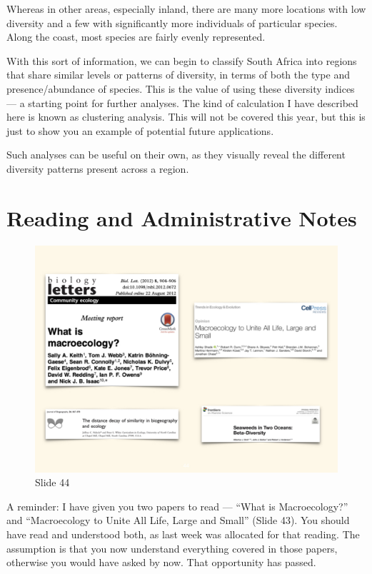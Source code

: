 \documentclass[
  11pt,
]{book}
\begin{document}
Whereas in other areas, especially inland, there are many more locations
with low diversity and a few with significantly more individuals of
particular species. Along the coast, most species are fairly evenly
represented.

With this sort of information, we can begin to classify South Africa
into regions that share similar levels or patterns of diversity, in
terms of both the type and presence/abundance of species. This is the
value of using these diversity indices --- a starting point for further
analyses. The kind of calculation I have described here is known as
clustering analysis. This will not be covered this year, but this is
just to show you an example of potential future applications.

Such analyses can be useful on their own, as they visually reveal the
different diversity patterns present across a region.

\section{Reading and Administrative
Notes}\label{reading-and-administrative-notes}

\begin{figure}[ht]
\centering
\includegraphics[width=0.8\linewidth]{../images/BDC334/BDC334-044.jpeg}
\caption*{Slide 44}
\end{figure}

A reminder: I have given you two papers to read --- ``What is
Macroecology?'' and ``Macroecology to Unite All Life, Large and Small''
(Slide 43). You should have read and understood both, as last week was
allocated for that reading. The assumption is that you now understand
everything covered in those papers, otherwise you would have asked by
now. That opportunity has passed.
\end{document}
